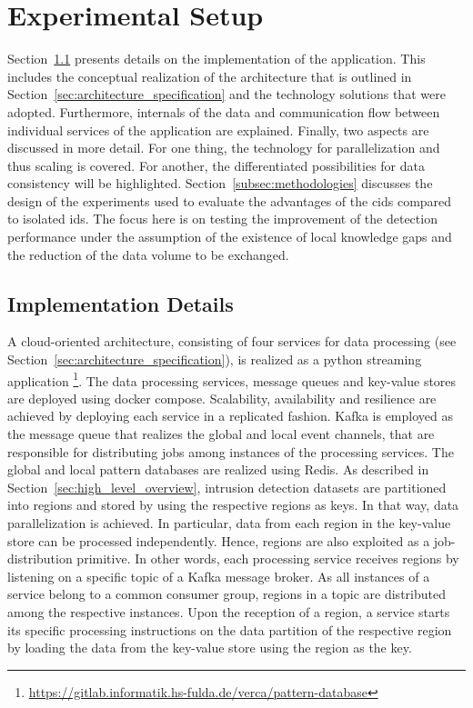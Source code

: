 \documentclass[../../main.tex]{subfiles}
\begin{document}
\section{Experimental Setup}

Section~\ref{subsec:implementation_details} presents details on the implementation of the application. This includes the conceptual realization of the architecture that is outlined in Section~\ref{sec:architecture_specification} and the technology solutions that were adopted.  Furthermore, internals of the data and communication flow between individual services of the application are explained. Finally, two aspects are discussed in more detail. For one thing, the technology for parallelization and thus scaling is covered. For another, the differentiated possibilities for data consistency will be highlighted. Section~\ref{subsec:methodologies} discusses the design of the experiments used to evaluate the advantages of the \gls{cids} compared to isolated \gls{ids}. The focus here is on testing the improvement of the detection performance under the assumption of the existence of local knowledge gaps and the reduction of the data volume to be exchanged.

\subsection{Implementation Details}\label{subsec:implementation_details}

A cloud-oriented architecture, consisting of four services for data processing (see Section~\ref{sec:architecture_specification}), is realized as a python streaming application \footnote{\url{https://gitlab.informatik.hs-fulda.de/verca/pattern-database}}. The data processing services, message queues and key-value stores are deployed using docker compose. Scalability, availability and resilience are achieved by deploying each service in a replicated fashion. Kafka is employed as the message queue that realizes the global and local event channels, that are responsible for distributing jobs among instances of the processing services. The global and local pattern databases are realized using Redis. As described in Section~\ref{sec:high_level_overview}, intrusion detection datasets are partitioned into regions and stored by using the respective regions as keys. In that way, data parallelization is achieved. In particular, data from each region in the key-value store can be processed independently. Hence, regions are also exploited as a job-distribution primitive. In other words, each processing service receives regions by listening on a specific topic of a Kafka message broker. As all instances of a service belong to a common consumer group, regions in a topic are distributed among the respective instances. Upon the reception of a region, a service starts its specific processing instructions on the data partition of the respective region by loading the data from the key-value store using the region as the key.
\end{document}
